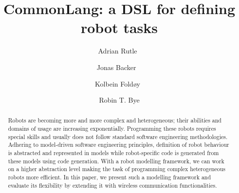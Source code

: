 \documentclass[runningheads]{llncs}
\begin{document}
%
\title{CommonLang: a DSL for defining robot tasks} %
%
%
\author{Adrian Rutle\hspace{-3pt}~\and
Jonas Backer \hspace{-3pt}~\and
Kolbein Fold{{\o}}y\hspace{-3pt}~\and
Robin T. Bye
}
%

%
\maketitle              %
%
\begin{abstract}
Robots are becoming more and more complex and heterogeneous; their abilities and domains of usage are increasing exponentially.
Programming these robots requires special skills and usually does not follow standard software engineering methodologies.
Adhering to model-driven software engineering principles, definition of robot behaviour is abstracted and represented in models while robot-specific code is generated from these models using code generation.
With a robot modelling framework, we can work on a higher abstraction level making the task of programming complex heterogeneous robots more efficient.
In this paper, we present such a modelling framework and evaluate its flexibility by extending it with wireless communication functionalities.

\end{abstract}
\end{document}
